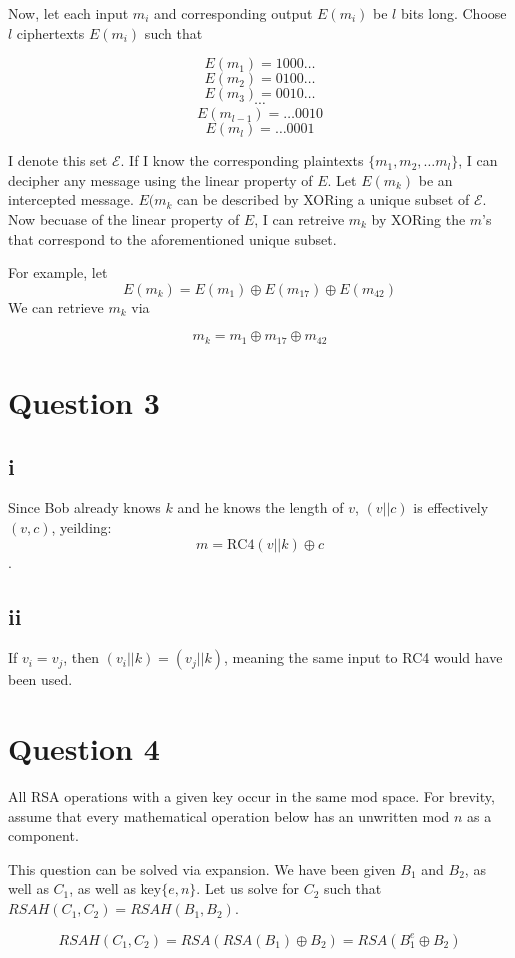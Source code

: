 \documentclass[a4paper,10pt]{article}
\begin{document}
Now, let each input $m_{i}$ and corresponding output $E(m_{i})$ be $l$ bits long.  Choose $l$ ciphertexts $E(m_{i})$ such that

$$E(m_{1}) = 1000\dots$$
$$E(m_{2}) = 0100\dots$$
$$E(m_{3}) = 0010\dots$$
$$\cdots{}$$
$$E(m_{l-1}) = \dots0010$$
$$E(m_{l}) = \dots0001$$

I denote this set $\mathscr{E}$. If I know the corresponding plaintexts $\{m_{1}, m_{2}, \dots m_{l}  \}$, I can decipher any message using the linear property of $E$. Let $E(m_{k})$ be an intercepted message. $E(m_{k}$ can be described by XORing a unique subset of  $\mathscr{E}$.  Now becuase of the linear property of $E$, I can retreive $m_{k}$ by XORing the $m$'s that correspond to the aforementioned unique subset.  

For example, let $$E(m_{k}) = E(m_{1}) \oplus E(m_{17}) \oplus E(m_{42}) $$ 
We can retrieve $m_{k}$ via

$$m_{k} = m_{1} \oplus m_{17} \oplus m_{42} $$



\section{Question 3}
\subsection{i} Since Bob already knows $k$ and he knows the length of $v$, $(v||c)$ is effectively $(v,c)$, yeilding:
$$m = \text{RC4}(v || k) \oplus c$$.
\subsection{ii}
If $v_{i} = v_{j}$, then $(v_{i} || k) =  (v_{j} || k)$, meaning the same input to RC4 would have been used.

\section{Question 4}
All RSA operations with a given key occur in the same mod space.  For brevity, assume that every mathematical operation below has an unwritten mod $n$ as a component. 

This question can be solved via expansion.  We have been given $B_{1}$ and $B_{2}$, as well as $C_{1}$, as well as key$\{e,n\}$.  Let us solve for $C_{2}$ such that $RSAH(C_{1},C_{2}) = RSAH(B_{1},B_{2})$.

$$RSAH(C_{1},C_{2}) = RSA(RSA(B_{1}) \oplus B_{2} ) = RSA( B_{1}^{e} \oplus B_{2} ) $$
\end{document}
